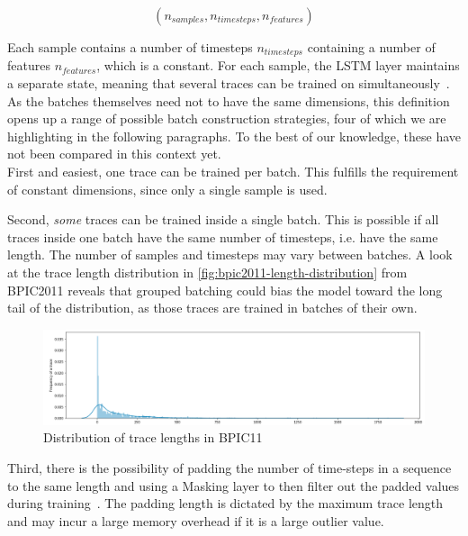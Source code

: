 $$(n_{samples}, n_{timesteps}, n_{features})$$

Each sample contains a number of timesteps $n_{timesteps}$ containing a number of features $n_{features}$, which is a constant. For each sample, the LSTM layer maintains a separate state, meaning that several traces can be trained on simultaneously~\cite{web:keras-lstm-state}. As the batches themselves need not to have the same dimensions, this definition opens up a range of possible batch construction strategies, four of which we are highlighting in the following paragraphs. To the best of our knowledge, these have not been compared in this context yet.\\

First and easiest, one trace can be trained per batch. This fulfills the requirement of constant dimensions, since only a single sample is used.

Second, \textit{some} traces can be trained inside a single batch. This is possible if all traces inside one batch have the same number of timesteps, i.e. have the same length. The number of samples and timesteps may vary between batches. A look at the trace length distribution in \autoref{fig:bpic2011-length-distribution} from BPIC2011 reveals that grouped batching could bias the model toward the long tail of the distribution, as those traces are trained in batches of their own.

\begin{figure}[ht!]
    \centering
    \includegraphics[width=.9\textwidth]{gfx/frequency-distribution.png}
    \caption{Distribution of trace lengths in BPIC11}
    \label{fig:bpic2011-length-distribution}
\end{figure}

Third, there is the possibility of padding the number of time-steps in a sequence to the same length and using a Masking layer to then filter out the padded values during training~\cite{web:keras}. The padding length is dictated by the maximum trace length and may incur a large memory overhead if it is a large outlier value.

